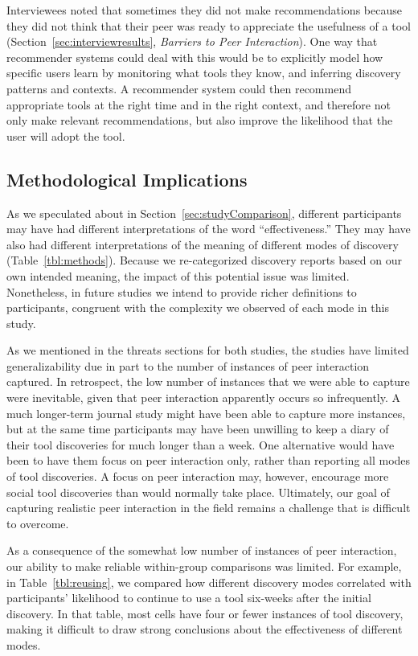 \documentclass[smallextended]{svjour3}
\newcommand\discovery{peer interaction\xspace}
\newcommand\context{mode\xspace}
\newcommand\contexts{modes\xspace}
\begin{document}
Interviewees noted that sometimes they did not make recommendations because they
did not think that their peer was ready to appreciate the usefulness of a tool 
(Section~\ref{sec:interviewresults}, \textit{Barriers to Peer Interaction}).
One way that recommender systems could deal with this would be to explicitly
model how specific users learn by monitoring what tools they know,
and inferring discovery patterns and contexts. 
A recommender system could then recommend appropriate tools at the right time
and in the right context, and therefore not only make relevant
recommendations, but also improve the likelihood that the user will
adopt the tool.

\subsection{Methodological Implications}

As we speculated about in Section~\ref{sec:studyComparison},
different participants may have had different interpretations of the word
``effectiveness.''
They may have also had different interpretations of 
the meaning of different \contexts of discovery (Table~\ref{tbl:methods}).
Because we re-categorized discovery reports based on our own intended meaning, 
the impact of this potential issue was limited.
Nonetheless, in future studies we intend to provide richer
definitions to participants, congruent with the complexity we observed of each
\context in this study.

As we mentioned in the threats sections for both studies,
the studies have limited generalizability due in part to 
the number of instances of \discovery captured.
In retrospect, the low number of instances that we were able to capture were 
inevitable, given that \discovery apparently occurs so infrequently.
A much longer-term journal study might have been able to capture more instances,
but at the same time participants may have been unwilling to keep a diary
of their tool discoveries for much longer than a week.
One alternative would have been to have them focus on \discovery only,
rather than reporting all \contexts of tool discoveries.
A focus on \discovery may, however, encourage more social tool discoveries than
would normally take place.
Ultimately, our goal of capturing realistic \discovery in the field remains a 
challenge that is difficult to overcome.

As a consequence of the somewhat low number of instances of \discovery,
our ability to make reliable within-group comparisons was limited.
For example, in Table~\ref{tbl:reusing}, we compared how different 
discovery \contexts correlated with participants' likelihood to continue to use a tool
six-weeks after the initial discovery.
In that table, most cells have four or fewer instances of tool discovery,
making it difficult to draw strong conclusions about the effectiveness of 
different \contexts.
\end{document}
